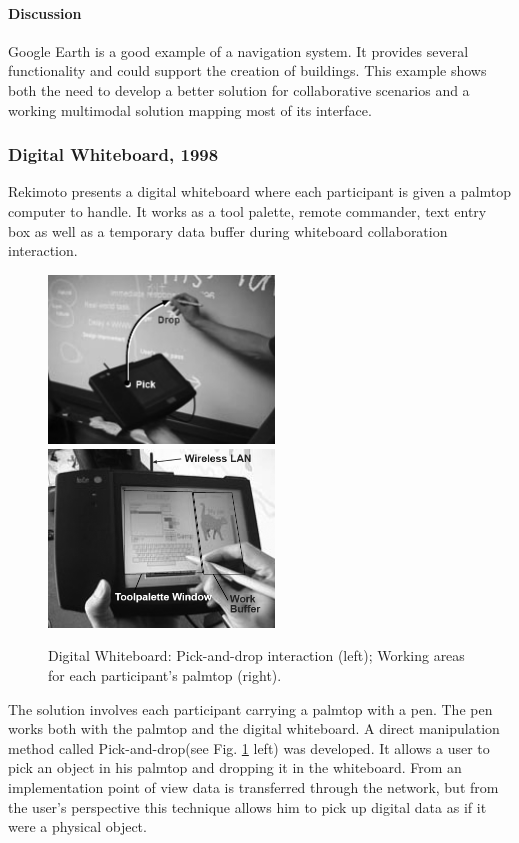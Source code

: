 \paragraph{Discussion}
\label{sec:Discussion}

Google Earth is a good example of a navigation system. It provides several functionality
and could support the creation of buildings. This example shows both the need to develop
a better solution for collaborative scenarios and a working multimodal solution mapping
most of its interface.



\subsubsection{Digital Whiteboard, 1998}

Rekimoto \cite{WBOARD} presents a digital whiteboard where each participant is given
a palmtop computer to handle. It works as a tool palette, remote commander, text entry box as
well as a temporary data buffer during whiteboard collaboration interaction.

\begin{figure}[!ht]
	\centering
	\includegraphics[width=6cm]{gfx/wboard.png}
	\includegraphics[width=6cm]{gfx/wboard2.png}
	\caption{Digital Whiteboard:
		Pick-and-drop interaction (left);
		Working areas for each participant's palmtop (right).}
	\label{FIG-WBOARD}
\end{figure}

The solution involves each participant carrying a palmtop with a pen.
The pen works both with the palmtop and the digital whiteboard.
A direct manipulation method called Pick-and-drop(see Fig. \ref{FIG-WBOARD} left) was developed.
It allows a user to pick an object in his palmtop and dropping it in the whiteboard.
From an implementation point of view data is transferred through the network, but from the user's perspective
this technique allows him to pick up digital data as if it were a physical object.

